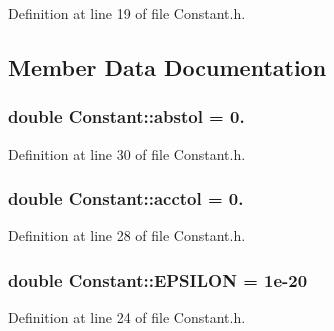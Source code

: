 Definition at line 19 of file Constant.\+h.



\subsection{Member Data Documentation}
\hypertarget{classConstant_ae9ad78ce3b1627c1045f78a1045f9d82}{}
\subsubsection[{abstol}]{\setlength{\rightskip}{0pt plus 5cm}double Constant\+::abstol = 0.\hspace{0.3cm}{\ttfamily [static]}}\label{classConstant_ae9ad78ce3b1627c1045f78a1045f9d82}


Definition at line 30 of file Constant.\+h.

\hypertarget{classConstant_a9fac745f9115a5e2026761c02b5df1d7}{}
\subsubsection[{acctol}]{\setlength{\rightskip}{0pt plus 5cm}double Constant\+::acctol = 0.\hspace{0.3cm}{\ttfamily [static]}}\label{classConstant_a9fac745f9115a5e2026761c02b5df1d7}


Definition at line 28 of file Constant.\+h.

\hypertarget{classConstant_ad5b72f523946f768cdff18907e43155e}{}
\subsubsection[{E\+P\+S\+I\+L\+O\+N}]{\setlength{\rightskip}{0pt plus 5cm}double Constant\+::\+E\+P\+S\+I\+L\+O\+N = 1e-\/20\hspace{0.3cm}{\ttfamily [static]}}\label{classConstant_ad5b72f523946f768cdff18907e43155e}


Definition at line 24 of file Constant.\+h.

\hypertarget{classConstant_a37bff4b53634ef172c8d87eded8d29bf}{}
